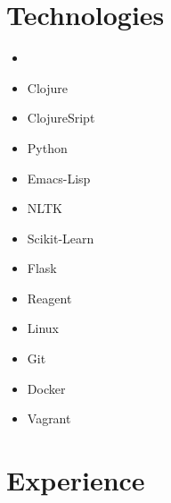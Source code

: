 \documentclass[11pt,a4paper,sans]{moderncv} %
\begin{document}
\section{Technologies}

\begin{minipage}[t]{0.16\textwidth}
    \begin{itemize}
        \item[]
    \end{itemize}
\end{minipage}
\begin{minipage}[t]{0.28\textwidth}
    \begin{itemize}[label=$-$]
        \setlength\itemsep{-0.5em}
        \item Clojure
        \item ClojureSript
        \item Python
        \item Emacs-Lisp
    \end{itemize}
\end{minipage}
\begin{minipage}[t]{0.28\textwidth}
    \begin{itemize}[label=$-$]
        \setlength\itemsep{-0.5em}
        \item NLTK
        \item Scikit-Learn
        \item Flask
        \item Reagent
    \end{itemize}
\end{minipage}
\begin{minipage}[t]{0.28\textwidth}
    \begin{itemize}[label=$-$]
        \setlength\itemsep{-0.5em}
        \item Linux
        \item Git
        \item Docker
        \item Vagrant
    \end{itemize}
\end{minipage}


\section{Experience}
\end{document}
